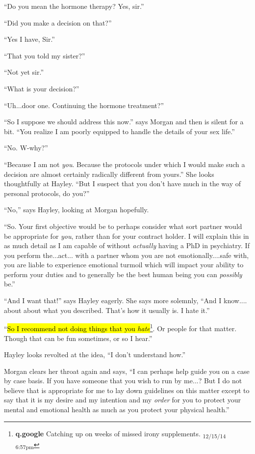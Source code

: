 ``Do you mean the hormone therapy?  Yes, sir.''

``Did you make a decision on that?''

``Yes I have, Sir.''

``That you told my sister?''

``Not yet sir.''

``What is your decision?''

``Uh...door one.  Continuing the hormone treatment?''

``So I suppose we should address this now.'' says Morgan and then is silent for a bit.  ``You realize I am poorly equipped to handle the details of your sex life.''

``No.  W-why?''

``Because I am not \textit{you}.  Because the protocols under which I would make such a decision are almost certainly radically different from yours.''  She looks thoughtfully at Hayley.  ``But I suspect that you don't have much in the way of personal protocols, do you?''

``No,'' says Hayley, looking at Morgan hopefully.

``So.  Your first objective would be to perhaps consider what sort partner would be appropriate for \textit{you}, rather than for your contract holder.  I will explain this in as much detail as I am capable of without \textit{actually} having a PhD in psychiatry.  If you perform the...act... with a partner whom you are not emotionally....safe with, you are liable to experience emotional turmoil which will impact your ability to perform your duties and to generally be the best human being you can \textit{possibly }be.''

``And I want that!'' says Hayley eagerly.  She says more solemnly, ``And I know.... about about what you described.  That's how it usually is.  I hate it.''

``\hl{So I recommend not doing things that you \textit{hate}}\footnote{\textbf{q.google }Catching up on weeks of missed irony supplements. \textsubscript{12/15/14 6:57pm}}.  Or people for that matter.  Though that can be fun sometimes, or so I hear.''

Hayley looks revolted at the idea, ``I don't understand how.''

Morgan clears her throat again and says, ``I can perhaps help guide you on a case by case basis.  If you have someone that you wish to run by me...?  But I do not believe that is appropriate for me to lay down guidelines on this matter except to say that it is my desire and my intention and my \textit{order} for you to protect your mental and emotional health as much as you protect your physical health.''

